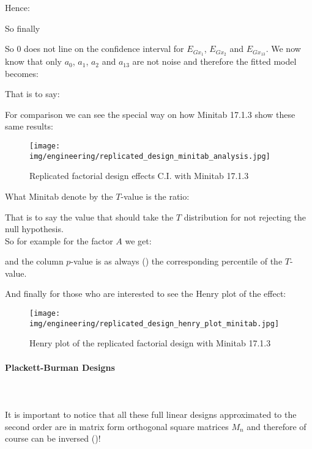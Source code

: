 	Hence:
	
	So finally
	
	So $0$ does not line on the confidence interval for $E_{Gx_1}$, $E_{Gx_2}$ and $E_{Gx_{13}}$. We now know that only $a_0$, $a_1$, $a_2$ and $a_{13}$ are not noise and therefore the fitted model becomes:
	
	That is to say:
	
	For comparison we can see the special way on how Minitab 17.1.3 show these same results:
	\begin{figure}[H]
		\begin{center}
		\texttt{[image: img/engineering/replicated\_design\_minitab\_analysis.jpg]}
		\end{center}	
		\caption[]{Replicated factorial design effects C.I. with Minitab 17.1.3}
	\end{figure}
	\begin{tcolorbox}[title=Remark,colframe=black,arc=10pt]
	What Minitab denote by the $T$-value is the ratio:
	
	That is to say the value that should take the $T$ distribution for not rejecting the null hypothesis.\\
	
	So for example for the factor $A$ we get:
	
	and the column $p$-value is as always () the corresponding percentile of the $T$-value.
	\end{tcolorbox}
	And finally for those who are interested to see the Henry plot of the effect:
	\begin{figure}[H]
		\begin{center}
		\texttt{[image: img/engineering/replicated\_design\_henry\_plot\_minitab.jpg]}
		\end{center}	
		\caption{Henry plot of the replicated factorial design with Minitab 17.1.3}
	\end{figure}
	
	\pagebreak
	\paragraph{Plackett-Burman Designs}\mbox{}\\\\
	It is important to notice that all these full linear designs approximated to the second order are in matrix form orthogonal square matrices $M_{n}$ and therefore of course can be inversed ()!
	
